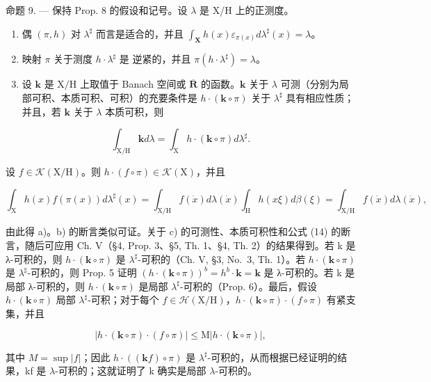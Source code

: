 命题 9. --- 保持 Prop. 8 的假设和记号。设 \(\lambda\) 是 X/H 上的正测度。

\begin{enumerate}
\def\labelenumi{\alph{enumi})}
\item
  偶 \((\pi, h)\) 对 \(\lambda^{\sharp}\) 而言是适合的，并且 \(\int_{\mathbf{X}} h(x) \varepsilon_{\pi(x)} d\lambda^{\sharp}(x) = \lambda\)。
\item
  映射 \(\pi\) 关于测度 \(h\cdot \lambda^{\sharp}\) 是 逆紧的，并且 \(\pi (h\cdot \lambda^{\sharp}) = \lambda\)。
\item
  设 \(\mathbf{k}\) 是 \(\mathrm{X / H}\) 上取值于 Banach 空间或 \(\overline{\mathbf{R}}\) 的函数。\(\mathbf{k}\) 关于 \(\lambda\) 可测（分别为局部可积、本质可积、可积）的充要条件是 \(h\cdot (\mathbf{k}\circ \pi)\) 关于 \(\lambda^{\sharp}\) 具有相应性质；并且，若 \(\mathbf{k}\) 关于 \(\lambda\) 本质可积，则
\end{enumerate}

\[
\int_ {\mathrm{X} / \mathrm{H}} \mathbf {k} d \lambda = \int_ {\mathrm{X}} h \cdot (\mathbf {k} \circ \pi) d \lambda^ {\sharp}.\tag{14}
\]

设 \(f \in \mathcal{K}(\mathrm{X}/\mathrm{H})\)。则 \(h \cdot (f \circ \pi) \in \mathcal{K}(\mathrm{X})\)，并且

\[
\int_ {\mathrm{X}} h (x) f (\pi (x)) d \lambda^ {\sharp} (x) = \int_ {\mathrm{X} / \mathrm{H}} f (\dot {x}) d \lambda (\dot {x}) \int_ {\mathrm{H}} h (x \xi) d \beta (\xi) = \int_ {\mathrm{X} / \mathrm{H}} f (\dot {x}) d \lambda (\dot {x}),
\]

由此得 a)。b) 的断言类似可证。关于 c) 的可测性、本质可积性和公式 (14) 的断言，随后可应用 Ch. V（§4, Prop. 3、§5, Th. 1、§4, Th. 2）的结果得到。若 k 是 λ-可积的，则 \(h \cdot (\mathbf{k} \circ \pi)\) 是 \(\lambda^{\sharp}\)-可积的（Ch. V, §3, No.~3, Th. 1）。若 \(h \cdot (\mathbf{k} \circ \pi)\) 是 \(\lambda^{\sharp}\)-可积的，则 Prop. 5 证明 \((h \cdot (\mathbf{k} \circ \pi))^b = h^b \cdot \mathbf{k} = \mathbf{k}\) 是 λ-可积的。若 k 是局部 λ-可积的，则 \(h \cdot (\mathbf{k} \circ \pi)\) 是局部 \(\lambda^{\sharp}\)-可积的（Prop. 6）。最后，假设 \(h \cdot (\mathbf{k} \circ \pi)\) 局部 \(\lambda^{\sharp}\)-可积；对于每个 \(f \in \mathcal{H}(\mathrm{X}/\mathrm{H})\)，\(h \cdot (\mathbf{k} \circ \pi) \cdot (f \circ \pi)\) 有紧支集，并且

\[
\left| h \cdot (\mathbf {k} \circ \pi) \cdot (f \circ \pi) \right| \leqslant \mathrm{M} \left| h \cdot (\mathbf {k} \circ \pi) \right|,
\]

其中 \(M = \sup |f|\)；因此 \(h \cdot ((\mathbf{k}f) \circ \pi)\) 是 \(\lambda^{\sharp}\)-可积的，从而根据已经证明的结果，kf 是 \(\lambda\)-可积的；这就证明了 k 确实是局部 \(\lambda\)-可积的。


